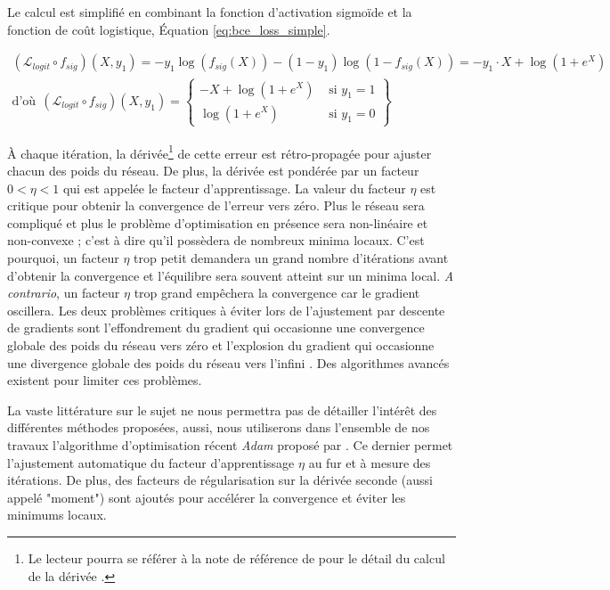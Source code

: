 Le calcul est simplifié en combinant la fonction d'activation sigmoïde et la fonction de coût logistique, Équation \ref{eq:bce_loss_simple}.

\begin{equation} \label{eq:bce_loss_simple}
\begin{split}
\left(\mathcal{L}_{logit} \circ f_{sig}\right)\left(X, y_{1}\right) = - y_{1} \log \left(f_{sig}(X)\right) -\left(1-y_{1}\right) \log \left(1-f_{sig}(X)\right) = -y_1 \cdot X +\log \left(1+e^{X}\right)
\\
\text{d'où} \ \ \left(\mathcal{L}_{logit} \circ f_{sig}\right)\left(X, y_{1}\right) = \left\{\begin{array}{cc}{- X +\log \left(1+e^{X}\right)} & {\text { si } y_{1}=1} \\ {\log \left(1+e^{X}\right)} & {\text { si } y_{1}=0}\end{array}\right\}
\end{split}
\end{equation}

À chaque itération, la dérivée\footnote{Le lecteur pourra se référer à la note de référence de \citeauthor{sadowski_notes_2016} pour le détail du calcul de la dérivée \cite{sadowski_notes_2016}.} de cette erreur est rétro-propagée pour ajuster chacun des poids du réseau.
De plus, la dérivée est pondérée par un facteur $0 < \eta < 1$ qui est appelée le facteur d'apprentissage.
La valeur du facteur $\eta$ est critique pour obtenir la convergence de l'erreur vers zéro.
Plus le réseau sera compliqué et plus le problème d'optimisation en présence sera non-linéaire et non-convexe ; c'est à dire qu'il possèdera de nombreux minima locaux.
C'est pourquoi, un facteur $\eta$ trop petit demandera un grand nombre d'itérations avant d'obtenir la convergence et l'équilibre sera souvent atteint sur un minima local.
\textit{A contrario}, un facteur $\eta$ trop grand empêchera la convergence car le gradient oscillera.
Les deux problèmes critiques à éviter lors de l'ajustement par descente de gradients sont l'effondrement du gradient qui occasionne une convergence globale des poids du réseau vers zéro et l'explosion du gradient qui occasionne une divergence globale des poids du réseau vers l'infini \cite{bengio_learning_1994, hochreiter_gradient_2001}.
Des algorithmes avancés existent pour limiter ces problèmes.

La vaste littérature sur le sujet ne nous permettra pas de détailler l'intérêt des différentes méthodes proposées, aussi, nous utiliserons dans l'ensemble de nos travaux l'algorithme d'optimisation récent \textit{Adam} proposé par \citeauthor{kingma_adam_2014} \cite{kingma_adam_2014}.
Ce dernier permet l'ajustement automatique du facteur d'apprentissage  $\eta$ au fur et à mesure des itérations.
De plus, des facteurs de régularisation sur la dérivée seconde (aussi appelé "moment") sont ajoutés pour accélérer la convergence et éviter les minimums locaux.

